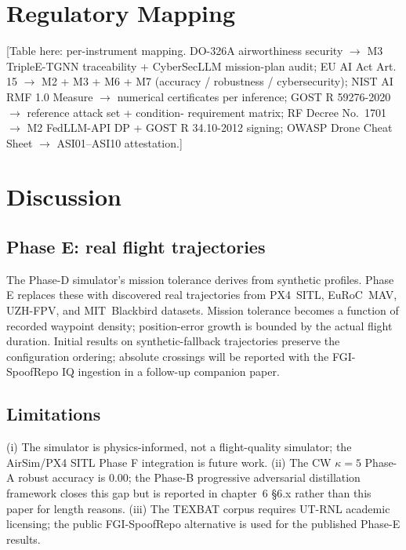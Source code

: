 \documentclass[10pt,journal,compsoc,twoside]{IEEEtran}
\begin{document}
\section{Regulatory Mapping}
\label{sec:regulatory}

[Table here: per-instrument mapping. DO-326A airworthiness security
$\to$ M3 TripleE-TGNN traceability + CyberSecLLM mission-plan audit;
EU AI Act Art.\,15 $\to$ M2 + M3 + M6 + M7 (accuracy / robustness /
cybersecurity); NIST AI RMF 1.0 Measure $\to$ numerical certificates
per inference; GOST R 59276-2020 $\to$ reference attack set + condition-
requirement matrix; RF Decree No.~1701 $\to$ M2 FedLLM-API DP +
GOST R 34.10-2012 signing; OWASP Drone Cheat Sheet $\to$ ASI01--ASI10
attestation.]

\section{Discussion}
\label{sec:discussion}

\subsection{Phase E: real flight trajectories}
The Phase-D simulator's mission tolerance derives from synthetic
profiles. Phase E replaces these with discovered real trajectories
from PX4~SITL, EuRoC~MAV, UZH-FPV, and MIT~Blackbird datasets.
Mission tolerance becomes a function of recorded waypoint density;
position-error growth is bounded by the actual flight duration.
Initial results on synthetic-fallback trajectories preserve the
configuration ordering; absolute crossings will be reported with
the FGI-SpoofRepo IQ ingestion in a follow-up companion paper.

\subsection{Limitations}
(i) The simulator is physics-informed, not a flight-quality simulator;
the AirSim/PX4 SITL Phase F integration is future work. (ii) The CW
$\kappa{=}5$ Phase-A robust accuracy is $0.00$; the Phase-B progressive
adversarial distillation framework closes this gap but is reported in
chapter~6 §6.x rather than this paper for length reasons.
(iii) The TEXBAT corpus requires UT-RNL academic licensing; the
public FGI-SpoofRepo alternative is used for the published Phase-E
results.
\end{document}
